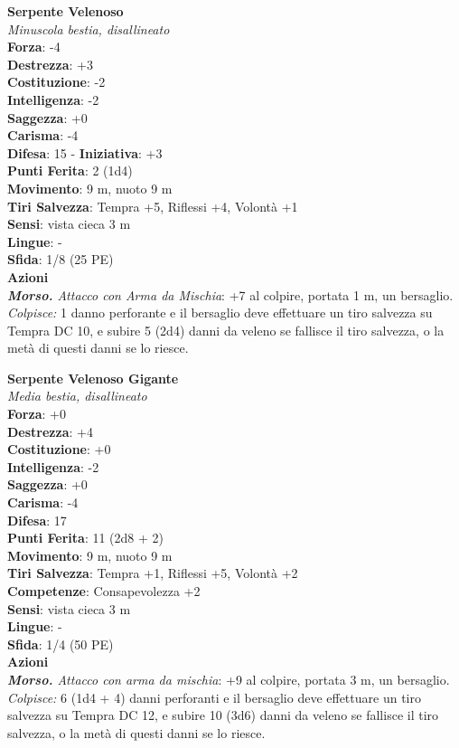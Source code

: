 \begin{multicols}{2}
\medskip\textbf{Serpente Velenoso}\\
\emph{Minuscola bestia, disallineato}\\
\textbf{Forza}: -4\\
\textbf{Destrezza}: +3\\
\textbf{Costituzione}: -2\\
\textbf{Intelligenza}: -2\\
\textbf{Saggezza}: +0\\
\textbf{Carisma}: -4\\
\textbf{Difesa}: 15 - \textbf{Iniziativa}: +3\\
\textbf{Punti Ferita}: 2 (1d4)\\
\textbf{Movimento}: 9 m, nuoto 9 m\\
\textbf{Tiri Salvezza}: Tempra +5, Riflessi +4, Volontà +1\\
\textbf{Sensi}: vista cieca 3 m\\
\textbf{Lingue}: -\\
\textbf{Sfida}: 1/8 (25 PE)\smallskip\\
\smallskip\textbf{Azioni}\\
\emph{\textbf{Morso.} Attacco con Arma da Mischia}: +7 al colpire, portata 1 m, un bersaglio.\\
\emph{Colpisce:} 1 danno perforante e il bersaglio deve effettuare un tiro salvezza su Tempra DC 10, e subire 5 (2d4) danni da veleno se fallisce il tiro salvezza, o la metà di questi danni se lo riesce.

\medskip\textbf{Serpente Velenoso Gigante}\\
\emph{Media bestia, disallineato}\\
\textbf{Forza}: +0\\
\textbf{Destrezza}: +4\\
\textbf{Costituzione}: +0\\
\textbf{Intelligenza}: -2\\
\textbf{Saggezza}: +0\\
\textbf{Carisma}: -4\\
\textbf{Difesa}: 17\\
\textbf{Punti Ferita}: 11 (2d8 + 2)\\
\textbf{Movimento}: 9 m, nuoto 9 m\\
\textbf{Tiri Salvezza}: Tempra +1, Riflessi +5, Volontà +2\\
\textbf{Competenze}: Consapevolezza +2\\
\textbf{Sensi}: vista cieca 3 m\\
\textbf{Lingue}: -\\
\textbf{Sfida}: 1/4 (50 PE)\smallskip\\
\smallskip\textbf{Azioni}\\
\emph{\textbf{Morso.} Attacco con arma da mischia}: +9 al colpire, portata 3 m, un bersaglio.\\
\emph{Colpisce:} 6 (1d4 + 4) danni perforanti e il bersaglio deve effettuare un tiro salvezza su Tempra DC  12, e subire 10 (3d6) danni da veleno se fallisce il tiro salvezza, o la metà di questi danni se lo riesce.\\


\end{multicols}
